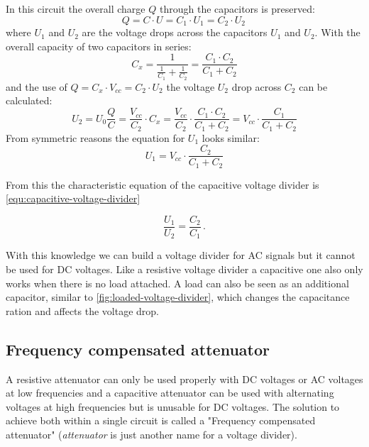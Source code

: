 In this circuit the overall charge $Q$ through the capacitors is preserved:
\begin{equation*}
	Q = C \cdot U = C_1 \cdot U_1 = C_2 \cdot U_2\,
\end{equation*}
where $U_1$ and $U_2$ are the voltage drops across the capacitors $U_1$ and $U_2$. With the overall capacity of two capacitors in series:
\begin{equation*}
	C_x = \frac{1}{\frac{1}{C_1} + \frac{1}{C_2}} = \frac{C_1 \cdot C_2}{C_1 + C_2}
\end{equation*}
and the use of $Q = C_x \cdot V_{cc} = C_2 \cdot U_2$ the voltage $U_2$ drop across $C_2$ can be calculated:
\begin{equation*}
	U_2 = U_0 \frac{Q}{C} =  \frac{V_{cc}}{C_2} \cdot C_x = \frac{V_{cc}}{C_2} \cdot \frac{C_1 \cdot C_2}{C_1 + C_2} = V_{cc} \cdot \frac{C_1}{C_1 + C_2}
\end{equation*}
From symmetric reasons the equation for $U_1$ looks similar:
\begin{equation*}
	U_1 =  V_{cc} \cdot \frac{C_2}{C_1 + C_2}
\end{equation*}

From this the characteristic equation of the capacitive voltage divider is \cref{equ:capacitive-voltage-divider}

\begin{equation}
	\frac{U_1}{U_2} = \frac{C_2}{C_1}\,.
	\label{equ:capacitive-voltage-divider}
\end{equation}

With this knowledge we can build a voltage divider for AC signals but it cannot be used for DC voltages. Like a resistive voltage divider a capacitive one also only works when there is no load attached. A load can also be seen as an additional capacitor, similar to \cref{fig:loaded-voltage-divider}, which changes the capacitance ration and affects the voltage drop.


\subsection{Frequency compensated attenuator}

A resistive attenuator can only be used properly with DC voltages or AC voltages at low frequencies and a capacitive attenuator can be used with alternating voltages at high frequencies but is unusable for DC voltages. The solution to achieve both within a single circuit is called a "Frequency compensated attenuator" (\textit{attenuator} is just another name for a voltage divider).


